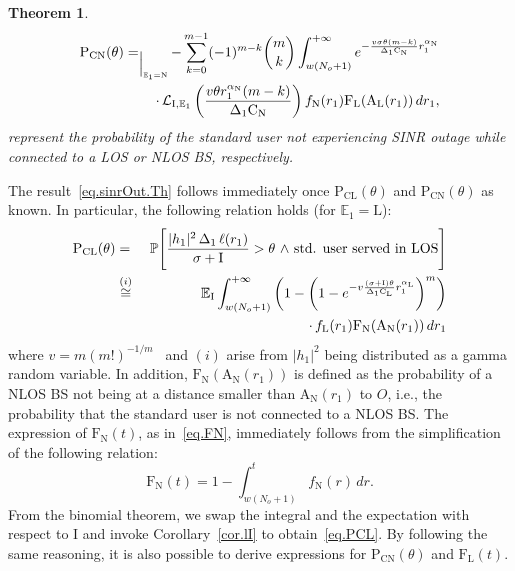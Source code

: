 \documentclass[10pt,journal,a4paper]{IEEEtran}
\newtheorem{theorem}{Theorem}[section]
\begin{document}
\begin{theorem}
\begin{eqnarray}
\mathrm{P}_\mathrm{CN}(\theta) &{}=_{\Big|_{\mathbb{E}_1 = \mathrm{N}}}{}& \hspace*{-4mm}-\sum_{k = 0}^{m-1}(-1)^{m-k}\binom{m}{k}\int_{w(N_o+1)}^{+\infty} e^{-\frac{v\sigma\theta(m-k)}{\Delta_1 \mathrm{C}_\mathrm{N}}r_1^{\alpha_\mathrm{N}}}\notag\\
&& \hspace{-13mm}\cdot \, \mathcal{L}_\mathrm{I,\mathbb{E}_1}\left(\frac{v\theta r_1^{\alpha_{\mathrm{N}}}(m-k)}{\Delta_1 \mathrm{C}_\mathrm{N}}\right) f_\mathrm{N}(r_1) \mathrm{F}_\mathrm{L}(\mathrm{A}_\mathrm{L}(r_1)) \, d r_1,\label{eq.PCN}
\end{eqnarray}
represent the probability of the standard user not experiencing SINR outage while connected to a LOS or NLOS BS, respectively.
\end{theorem}
\begin{IEEEproof}
The result~\eqref{eq.sinrOut.Th} follows immediately once $\mathrm{P}_\mathrm{CL}(\theta)$ and $\mathrm{P}_\mathrm{CN}(\theta)$ as known. In particular, the following relation holds (for $\mathbb{E}_1 = \mathrm{L}$):
\setlength{\arraycolsep}{0.0em} 
\begin{eqnarray}
\mathrm{P}_\mathrm{CL}(\theta) &{}={}& \mathbb{P}\Bigg[\frac{|h_1|^2 \,\Delta_1\, \ell(r_1)}{\sigma + \mathrm{I}} > \theta \,\,\text{$\land$ std. user served in LOS}\Bigg]\notag\\
&{}\stackrel{(i)}{\cong}{}& \mathbb{E}_\mathrm{I} \int_{w(N_o+1)}^{+\infty}      \left( 1 - \left(1-e^{-v\frac{(\sigma + \mathrm{I})\theta}{\Delta_1 \mathrm{C}_\mathrm{L}}r_1^{\alpha_\mathrm{L}}}\right)^m\right)\notag\\
&& \cdot \,f_\mathrm{L}(r_1) \mathrm{F}_\mathrm{N}(\mathrm{A}_\mathrm{N}(r_1)) \, d r_1
\end{eqnarray}
where $v = m(m!)^{-1/m}$~\cite[Lemma 6]{6932503} and $(i)$ arise from $|h_1|^2$ being distributed as a gamma random variable. In addition, $\mathrm{F}_\mathrm{N}(\mathrm{A}_\mathrm{N}(r_1))$ is defined as the probability of a NLOS BS not being at a distance smaller than $\mathrm{A}_\mathrm{N}(r_1)$ to $O$, i.e., the probability that the standard user is not connected to a NLOS BS. The expression of $\mathrm{F}_\mathrm{N}(t)$, as in~\eqref{eq.FN}, immediately follows from the simplification of the following relation:
\begin{equation}
\mathrm{F}_\mathrm{N}(t) = 1 - \int_{w(N_o+1)}^{t} f_\mathrm{N}(r) \, dr.
\end{equation}
From the binomial theorem, we swap the integral and the expectation with respect to $\mathrm{I}$ and invoke Corollary~\ref{cor.lI} to obtain~\eqref{eq.PCL}. By following the same reasoning, it is also possible to derive expressions for $\mathrm{P}_\mathrm{CN}(\theta)$ and $\mathrm{F}_\mathrm{L}(t)$.
\end{IEEEproof}
\end{document}
